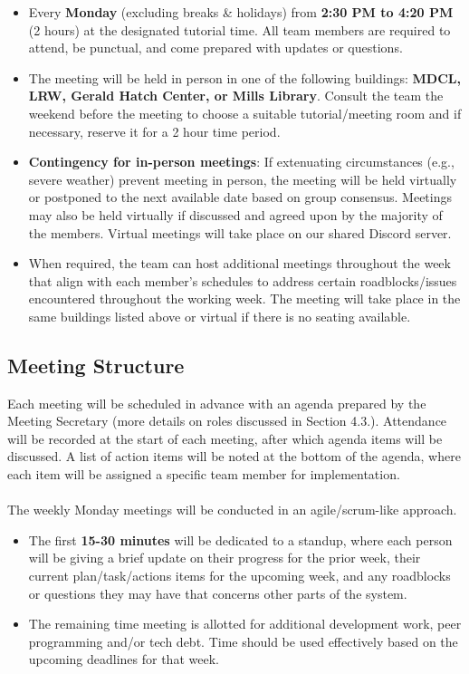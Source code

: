 \documentclass{article}
\begin{document}
\begin{itemize}
    \item Every \textbf{Monday} (excluding breaks \& holidays) from \textbf{2:30 PM to 4:20 PM} (2 hours) at the designated tutorial time. All team members are required to attend, be punctual, and come prepared with updates or questions.
    
    \item The meeting will be held in person in one of the following buildings: \textbf{MDCL, LRW, Gerald Hatch Center, or Mills Library}. Consult the team the weekend before the meeting to choose a suitable tutorial/meeting room and if necessary, reserve it for a 2 hour time period.
    
    \item \textbf{Contingency for in-person meetings}: If extenuating circumstances (e.g., severe weather) prevent meeting in person, the meeting will be held virtually or postponed to the next available date based on group consensus. Meetings may also be held virtually if discussed and agreed upon by the majority of the members. Virtual meetings will take place on our shared Discord server.

    \item When required, the team can host additional meetings throughout the week that align with each member’s schedules to address certain roadblocks/issues encountered throughout the working week. The meeting will take place in the same buildings listed above or virtual if there is no seating available.
\end{itemize}

\subsection{Meeting Structure}
Each meeting will be scheduled in advance with an agenda prepared by the Meeting Secretary (more details on roles discussed in Section 4.3.). Attendance will be recorded at the start of each meeting, after which agenda items will be discussed. A list of action items will be noted at the bottom of the agenda, where each item will be assigned a specific team member for implementation.
\\
\\
The weekly Monday meetings will be conducted in an agile/scrum-like approach. 
\begin{itemize}
    \item The first \textbf{15-30 minutes} will be dedicated to a standup, where each person will be giving a brief update on their progress for the prior week, their current plan/task/actions items for the upcoming week, and any roadblocks or questions they may have that concerns other parts of the system.
    \item The remaining time meeting is allotted for additional development work, peer programming and/or tech debt. Time should be used effectively based on the upcoming deadlines for that week.
\end{itemize}
\end{document}
